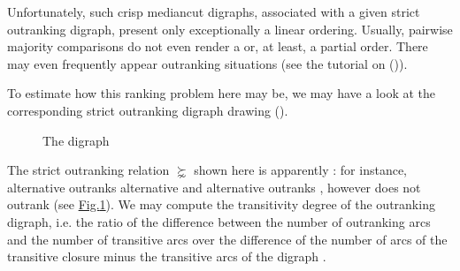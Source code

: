 \documentclass[a4paper,12pt,english]{sphinxhowto}
\let\sphinxpxdimen\pdfpxdimen\else\newdimen\sphinxpxdimen
\begin{document}
Unfortunately, such crisp median\sphinxhyphen{}cut  digraphs, associated with a given strict outranking digraph, present only exceptionally a linear ordering. Usually, pairwise majority comparisons do not even render a  or, at least, a  partial order. There may even frequently appear  outranking situations (see the tutorial on {\hyperref[\detokenize{tutorial:linearvoting-tutorial-label}]{}} ()).

To estimate how  this ranking problem here may be, we may have a look at the corresponding strict outranking digraph  drawing (\sphinxfootnotemark[1]).

\begin{sphinxVerbatim}[commandchars=\\\{\},numbers=left,firstnumber=1,stepnumber=1]
\end{sphinxVerbatim}

\begin{figure}[H]
\centering
\capstart

\noindent\sphinxincludegraphics[width=300\sphinxpxdimen]{{rankingTutorial}.png}
\caption{The  digraph}\label{\detokenize{tutorial:rankingtutorial}}\end{figure}

The strict outranking relation  \(\succnsim\) shown here is apparently : for instance, alternative  outranks alternative  and alternative  outranks , however  does not outrank  (see \hyperref[\detokenize{tutorial:rankingtutorial}]{Fig.\@ \ref{\detokenize{tutorial:rankingtutorial}}}). We may compute the transitivity degree of the outranking digraph, i.e. the ratio of the difference between the number of outranking arcs and the number of transitive arcs over the difference of the number of arcs of the transitive closure minus the transitive arcs of the digraph .
\end{document}
